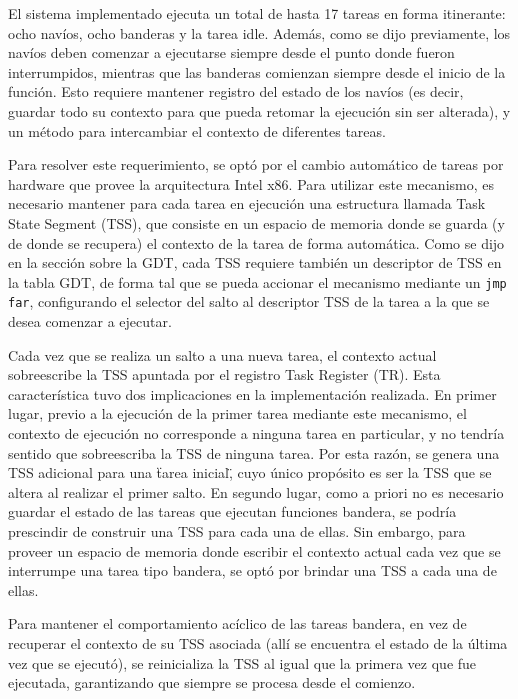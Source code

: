 	El sistema implementado ejecuta un total de hasta 17 tareas en forma itinerante: 
ocho navíos, ocho banderas y la tarea idle. Además, como se dijo previamente, 
los navíos deben comenzar a ejecutarse siempre desde el punto donde fueron interrumpidos, 
mientras que las banderas comienzan siempre desde el inicio de la función. Esto requiere 
mantener registro del estado de los navíos (es decir, guardar todo su contexto para que 
pueda retomar la ejecución sin ser alterada), y un método para intercambiar el contexto 
de diferentes tareas.

	Para resolver este requerimiento, se optó por el cambio automático 
de tareas por hardware que provee la arquitectura Intel x86. Para utilizar este mecanismo, 
es necesario mantener para cada tarea en ejecución una estructura llamada Task State 
Segment (TSS), que consiste en un espacio de memoria donde se guarda (y de donde se 
recupera) el contexto de la tarea de forma automática. Como se dijo en la sección sobre la GDT, 
cada TSS requiere también un descriptor de TSS en la tabla GDT, de forma tal que se pueda 
accionar el mecanismo mediante un \texttt{jmp far}, configurando el selector del salto 
al descriptor TSS de la tarea a la que se desea comenzar a ejecutar.

	Cada vez que se realiza un salto a una nueva tarea, el contexto actual sobreescribe 
la TSS apuntada por el registro Task Register (TR). Esta característica tuvo dos implicaciones 
en la implementación realizada. En primer lugar, previo a la ejecución de la primer tarea 
mediante este mecanismo, el contexto de ejecución no corresponde a ninguna tarea en particular, y 
no tendría sentido que sobreescriba la TSS de ninguna tarea. Por esta razón, se genera una 
TSS adicional para una \"tarea inicial\", cuyo único propósito es ser la TSS que se altera 
al realizar el primer salto. En segundo lugar, como a priori no es necesario guardar el estado de las tareas que ejecutan funciones bandera, se podría prescindir de construir una TSS para cada 
una de ellas. Sin embargo, para proveer un espacio de memoria donde escribir el contexto actual 
cada vez que se interrumpe una tarea tipo bandera, se optó por brindar una TSS a cada una de ellas.

	Para mantener el comportamiento acíclico de las tareas bandera, en vez de recuperar el 
contexto de su TSS asociada (allí se encuentra el estado de la última vez que se ejecutó), se
reinicializa la TSS al igual que la primera vez que fue ejecutada, garantizando que siempre se
procesa desde el comienzo.	
